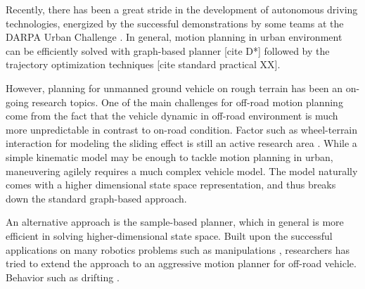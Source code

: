 \documentclass[../thesis.tex]{subfiles}
\begin{document}



Recently, there has been a great stride in the development of autonomous driving technologies, energized by the successful demonstrations by some teams at the DARPA Urban Challenge \cite{boss, multimodaltartan}. In general,
motion planning in urban environment can be efficiently solved with graph-based planner [cite D*] followed by the trajectory optimization techniques [cite standard practical XX]. 

However, planning for unmanned ground vehicle on rough terrain has been an on-going research topics. 
One of the main challenges for off-road motion planning come from the fact that the vehicle dynamic in off-road environment is much more unpredictable in contrast to on-road condition. Factor such as wheel-terrain interaction for modeling the sliding effect is still an active research area . 
While a simple kinematic model may be enough to tackle motion planning in urban, maneuvering agilely requires a much complex vehicle model. The model naturally comes with a higher dimensional state space representation, and thus breaks down the standard graph-based approach. 

An alternative approach is the sample-based planner, which in general is more efficient in solving higher-dimensional state space. 
Built upon the successful applications on many robotics problems such as manipulations \cite{}, researchers has tried to extend the approach to an aggressive motion planner for off-road vehicle. 
Behavior 
such as drifting \cite{}.
\end{document}
